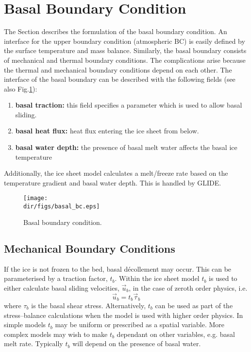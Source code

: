\section{Basal Boundary Condition}
The Section describes the formulation of the basal boundary condition.
An interface for the upper boundary condition (atmospheric BC) is easily defined by the surface temperature and mass balance. Similarly, the basal boundary consists of mechanical and thermal boundary conditions. The complications arise because the thermal and mechanical boundary conditions depend on each other. The interface of the basal boundary can be described with the following fields (see also Fig.\ref{num.fig.basal_bc}):
\begin{enumerate}
\item \textbf{basal traction:} this field specifies a parameter which is used to allow basal sliding.
\item \textbf{basal heat flux:} heat flux entering the ice sheet from below.
\item \textbf{basal water depth:} the presence of basal melt water affects the basal ice temperature
\end{enumerate}
Additionally, the ice sheet model calculates a melt/freeze rate based on the temperature gradient and basal water depth. This is handled by GLIDE.

\begin{figure}[htbp]
  \centering
  \texttt{[image: \\dir/figs/basal\_bc.eps]}
  \caption{Basal boundary condition.}
  \label{num.fig.basal_bc}
\end{figure}

\subsection{Mechanical Boundary Conditions}
If the ice is not frozen to the bed, basal d\'{e}collement may occur. This can be parameterised by a traction factor, $t_b$. Within the ice sheet model $t_b$ is used to either calculate basal sliding velocities, $\vec{u}_b$, in the case of zeroth order physics, i.e.
\begin{equation}
  \vec{u}_b=t_b\vec{\tau}_b
\end{equation}
where $\tau_b$ is the basal shear stress. Alternatively, $t_b$ can be used as part of the stress--balance calculations when the model is used with higher order physics. In simple models $t_b$ may be uniform or prescribed as a spatial variable. More complex models may wish to make $t_b$ dependant on other variables, e.g. basal melt rate. Typically $t_b$ will depend on the presence of basal water.

